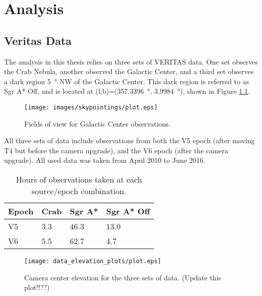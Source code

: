 \cleartooddpage[\thispagestyle{empty}]
\chapter{Analysis}

\section{Veritas Data}
  The analysis in this thesis relies on three sets of VERITAS data.
  One set observes the Crab Nebula, another observed the Galactic Center, and a third set observes a dark region \SI{5}{\degree} NW of the Galactic Center.
  This dark region is referred to as  Sgr A* Off, and is located at (l,b)=(\SI{357.3396}{\degree}, \SI{3.9984}{\degree}), shown in Figure \ref{fig:gcfieldsofview}.

  \begin{figure}[ht]
    \begin{center}
      \texttt{[image: images/skypointings/plot.eps]}
      \caption[VERITAS Galactic Center Pointings]{Fields of view for Galactic Center observations.}\label{fig:gcfieldsofview}
    \end{center}
  \end{figure}

  All three sets of data include observations from both the V5 epoch (after moving T4 but before the camera upgrade), and the V6 epoch (after the camera upgrade).
  All used data was taken from April 2010 to June 2016.

  \begin{table}[]
    \centering
    \caption{Hours of observations taken at each source/epoch combination.}
    \label{my-label}
    \begin{tabular}{|l|l|l|l|}
      \hline
      \textbf{Epoch} & \textbf{Crab} & \textbf{Sgr A*} & \textbf{Sgr A* Off} \\ \hline
      V5             & 3.3           & 46.3            & 13.0                \\ \hline
      V6             & 5.5           & 62.7            & 4.7                 \\ \hline
    \end{tabular}
  \end{table}


  \begin{figure}[ht]
    \centering
    \texttt{[image: data\_elevation\_plots/plot.eps]}
    \caption[VERITAS Data Elevation Exposure]
    {Camera center elevation for the three sets of data. (Update this plot!!??)}
    \label{fig:datapointingelevations}
  \end{figure}


